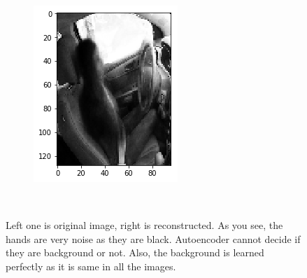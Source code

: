 \documentclass[12pt, letterpaper]{article}
\begin{document}
\begin{figure}[H]
\begin{subfigure}[b]{0.3\textwidth}
        \includegraphics[width=\textwidth]{ae-r2}
        \label{fig:tiger}
    \end{subfigure}
    ~ %
    \caption{Left one is original image, right is reconstructed. As you see, the hands are very noise as they are black. Autoencoder cannot decide if they are background or not. Also, the background is learned perfectly as it is same in all the images.}
  \label{fig:animals}
\end{figure}
 
\end{document}
